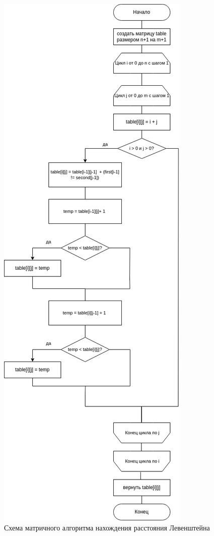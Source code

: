 \clearpage

\begin{figure}[h!]
	\centering
	\includegraphics[height=0.8\textheight]{tex_parts/scheme3.png}
	\caption{\label{fig:levItr}Схема матричного алгоритма нахождения расстояния Левенштейна}
\end{figure}

